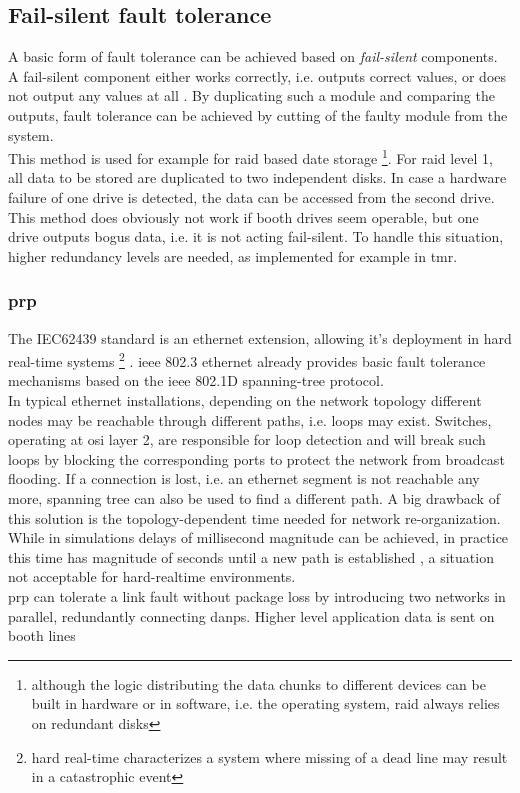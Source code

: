 \subsection{Fail-silent fault tolerance}
A basic form of fault tolerance can be achieved based on \textit{fail-silent} components. A fail-silent component
either works correctly, i.e. outputs correct values, or does not output any values at all \cite{544479}. By duplicating such a module and comparing the
outputs, fault tolerance can be achieved by cutting of the faulty module from the system.
\\
This method is used for example for \gls{raid} based date storage \footnote{although the logic distributing
the data chunks to different devices can be built in hardware or in software, i.e. the operating system, \gls{raid} always relies on redundant disks}.
For \gls{raid} level 1, all data to be stored are duplicated to two independent disks. In case a hardware failure of one drive is detected, the data can be accessed
from the second drive. This method does obviously not work if booth drives seem operable, but one drive outputs bogus data, i.e. it is not acting fail-silent.
To handle this situation, higher redundancy levels are needed, as implemented for example in \gls{tmr}. 

\subsubsection{\gls{prp}}
The IEC62439 standard is an ethernet extension, allowing it's deployment in hard real-time systems \footnote{hard real-time characterizes a system
where missing of a dead line may result in a catastrophic event} \cite{4416946}. \gls{ieee} 802.3 ethernet
already provides basic fault tolerance mechanisms based on the \gls{ieee} 802.1D spanning-tree protocol. 
\\
In typical ethernet installations, depending on the network topology different
nodes may be reachable through different paths, i.e. loops may exist. Switches, operating at \gls{osi} layer 2, are responsible for loop detection and will break
such loops by blocking the corresponding ports to protect the network from broadcast flooding. If a connection is lost, i.e. an ethernet segment is not 
reachable any more, spanning tree can also be used to find a different path. A big drawback of this solution is the topology-dependent time needed for network
re-organization. While in simulations delays of millisecond magnitude can be achieved, in practice this time has magnitude of seconds until a new path
is established \cite{4447112}, a situation not acceptable for hard-realtime environments.
\\
\gls{prp} can tolerate a link fault without package loss by introducing two networks in parallel, redundantly connecting \glspl{danp}. Higher level application
data is sent on booth lines

